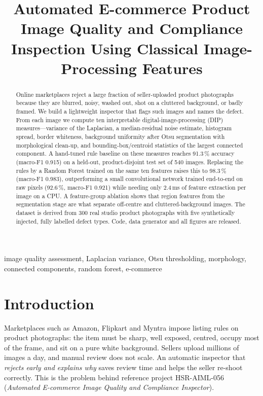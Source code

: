 \documentclass[conference]{IEEEtran}
\begin{document}
\title{Automated E-commerce Product Image Quality and Compliance Inspection Using Classical Image-Processing Features}

\author{
}
\maketitle

\begin{abstract}
Online marketplaces reject a large fraction of seller-uploaded product photographs because they are blurred, noisy, washed out, shot on a cluttered background, or badly framed. We build a lightweight inspector that flags such images and names the defect. From each image we compute ten interpretable digital-image-processing (DIP) measures---variance of the Laplacian, a median-residual noise estimate, histogram spread, border whiteness, background uniformity after Otsu segmentation with morphological clean-up, and bounding-box/centroid statistics of the largest connected component. A hand-tuned rule baseline on these measures reaches 91.3\,\% accuracy (macro-F1 0.915) on a held-out, product-disjoint test set of 540 images. Replacing the rules by a Random Forest trained on the same ten features raises this to 98.3\,\% (macro-F1 0.983), outperforming a small convolutional network trained end-to-end on raw pixels (92.6\,\%, macro-F1 0.921) while needing only 2.4\,ms of feature extraction per image on a CPU. A feature-group ablation shows that region features from the segmentation stage are what separate off-centre and cluttered-background images. The dataset is derived from 300 real studio product photographs with five synthetically injected, fully labelled defect types. Code, data generator and all figures are released.
\end{abstract}

\begin{IEEEkeywords}
image quality assessment, Laplacian variance, Otsu thresholding, morphology, connected components, random forest, e-commerce
\end{IEEEkeywords}

\section{Introduction}
Marketplaces such as Amazon, Flipkart and Myntra impose listing rules on product photographs: the item must be sharp, well exposed, centred, occupy most of the frame, and sit on a pure white background. Sellers upload millions of images a day, and manual review does not scale. An automatic inspector that \emph{rejects early and explains why} saves review time and helps the seller re-shoot correctly. This is the problem behind reference project HSR-AIML-056 (\emph{Automated E-commerce Image Quality and Compliance Inspector}).
\end{document}

